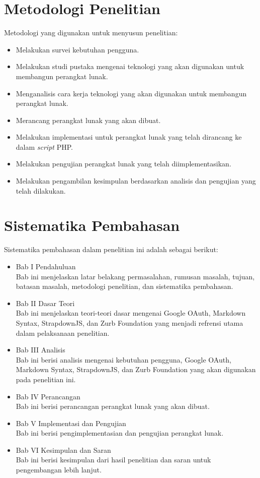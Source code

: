 \section{Metodologi Penelitian}
Metodologi yang digunakan untuk menyusun penelitian:
\begin{itemize}
    \item Melakukan survei kebutuhan pengguna.
	\item Melakukan studi pustaka mengenai teknologi yang akan digunakan untuk
	membangun perangkat lunak.
	\item Menganalisis cara kerja teknologi yang akan digunakan untuk membangun
	perangkat lunak.
	\item Merancang perangkat lunak yang akan dibuat.
	\item Melakukan implementasi untuk perangkat lunak yang
	telah dirancang ke dalam {\it script} PHP.
	\item Melakukan pengujian perangkat lunak yang telah diimplementasikan.
	\item Melakukan pengambilan kesimpulan berdasarkan analisis dan pengujian yang telah dilakukan.
\end{itemize}

\section{Sistematika Pembahasan}
Sistematika pembahasan dalam penelitian ini adalah sebagai berikut:
\begin{itemize}
	\item Bab I Pendahuluan\\
	Bab ini menjelaskan latar belakang permasalahan, rumusan masalah, tujuan, batasan masalah, metodologi penelitian, dan sistematika pembahasan.
	\item Bab II Dasar Teori\\
	Bab ini menjelaskan teori-teori dasar mengenai Google OAuth, Markdown Syntax, StrapdownJS, dan Zurb Foundation yang menjadi refrensi utama dalam pelaksanaan penelitian.
	\item Bab III Analisis\\
	Bab ini berisi analisis mengenai kebutuhan pengguna, Google OAuth, Markdown Syntax, StrapdownJS, dan Zurb Foundation yang akan digunakan pada penelitian ini.
	\item Bab IV Perancangan\\
	Bab ini berisi perancangan perangkat lunak yang akan dibuat.
	\item Bab V Implementasi dan Pengujian\\
	Bab ini berisi pengimplementasian dan pengujian perangkat lunak.
	\item Bab VI Kesimpulan dan Saran\\
	Bab ini berisi kesimpulan dari hasil penelitian dan saran untuk pengembangan lebih lanjut.
\end{itemize}